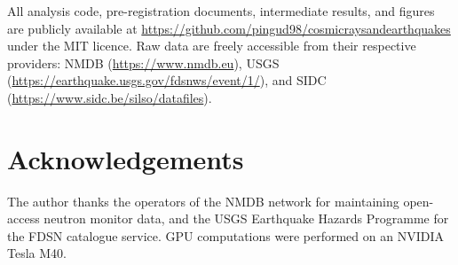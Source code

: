 \documentclass[12pt,a4paper]{article}
\begin{document}
All analysis code, pre-registration documents, intermediate results, and figures
are publicly available at
\url{https://github.com/pingud98/cosmicraysandearthquakes} under the MIT licence.
Raw data are freely accessible from their respective providers:
NMDB (\url{https://www.nmdb.eu}),
USGS (\url{https://earthquake.usgs.gov/fdsnws/event/1/}),
and SIDC (\url{https://www.sidc.be/silso/datafiles}).

\section*{Acknowledgements}

The author thanks the operators of the NMDB network for maintaining open-access
neutron monitor data, and the USGS Earthquake Hazards Programme for the FDSN
catalogue service.
GPU computations were performed on an NVIDIA Tesla M40.



\end{document}
